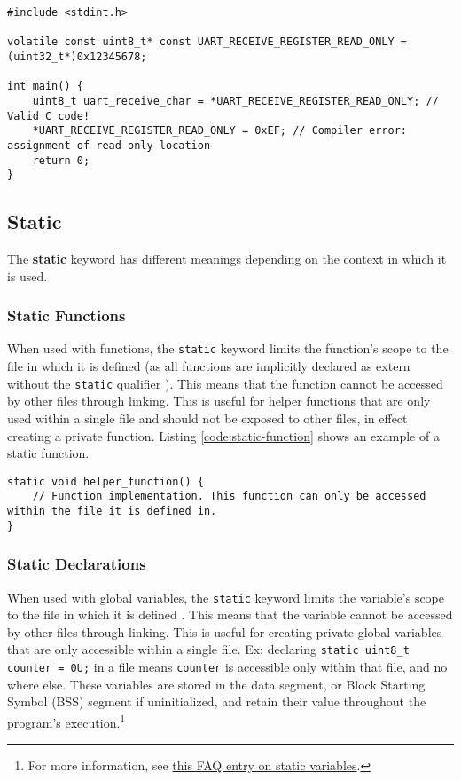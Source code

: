 \documentclass[main.tex]{subfiles}
\begin{document}
\begin{lstlisting}[caption={Example use case of Const}, label={code:const-use-case}]
#include <stdint.h>

volatile const uint8_t* const UART_RECEIVE_REGISTER_READ_ONLY = (uint32_t*)0x12345678;

int main() {
    uint8_t uart_receive_char = *UART_RECEIVE_REGISTER_READ_ONLY; // Valid C code!
    *UART_RECEIVE_REGISTER_READ_ONLY = 0xEF; // Compiler error: assignment of read-only location
    return 0;
}
\end{lstlisting}

\subsection{Static}
The \textbf{static} keyword has different meanings depending on the context in which it is used.
\subsubsection{Static Functions}
When used with functions, the \texttt{static} keyword limits the function's scope to the file in which it is defined (as all functions are implicitly declared as extern without the \texttt{static} qualifier \cite{arm_static}). This means that the function cannot be accessed by other files through linking. This is useful for helper functions that are only used within a single file and should not be exposed to other files, in effect creating a private function. Listing \ref{code:static-function} shows an example of a static function.


\begin{lstlisting}[caption={Example of a Static Function}, label={code:static-function}]
static void helper_function() {
    // Function implementation. This function can only be accessed within the file it is defined in.
}
\end{lstlisting}

\subsubsection{Static Declarations}
When used with global variables, the \texttt{static} keyword limits the variable's scope to the file in which it is defined \cite{arm_static}. This means that the variable cannot be accessed by other files through linking. This is useful for creating private global variables that are only accessible within a single file. Ex: declaring \texttt{static uint8\_t counter = 0U;} in a file means \texttt{counter} is accessible only within that file, and no where else. These variables are stored in the data segment, or Block Starting Symbol (BSS) segment if uninitialized, and retain their value throughout the program's execution.\footnote{For more information, see \href{https://cosmic-software.com/faq/faq17.php}{this FAQ entry on static variables}.}
\end{document}
